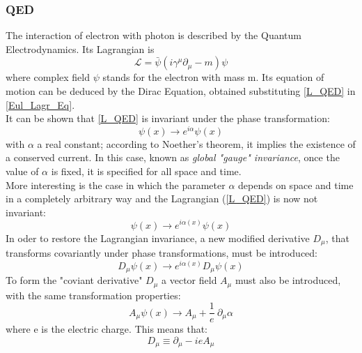 \subsubsection{QED}
The interaction of electron with photon is described by the Quantum Electrodynamics. Its Lagrangian is
\begin{equation}
\mathcal{L} = \bar{\psi}(i\gamma^{\mu}\partial_{\mu}-m)\psi
\label{L_QED}
\end{equation}
where complex field $\psi$ stands for the electron with mass m. Its equation of motion can be deduced by the Dirac Equation, obtained substituting \ref{L_QED} in \ref{Eul_Lagr_Eq}.\\
It can be shown that \ref{L_QED} is invariant under the phase transformation:
\begin{equation}
\psi(x)\to e^{i\alpha} \psi(x)
\label{global_trans}
\end{equation}
with $\alpha$ a real constant; according to Noether's theorem, it implies the existence of a conserved current.
In this case, known as \textit{global "gauge" invariance}, once the value of $\alpha$ is fixed, it is specified for all space and time. \\
More interesting is the case in which the parameter $\alpha$ depends on space and time in a completely arbitrary way and the Lagrangian (\ref{L_QED}) is now not invariant:
\begin{equation}
\psi(x)\to e^{i\alpha(x)} \psi(x)
\label{local_trans}
\end{equation}
In oder to restore the Lagrangian invariance, a new modified derivative $D_{\mu}$, that transforms covariantly under phase transformations, must be introduced: 
\begin{equation}
D_{\mu}\psi(x)\to e^{i\alpha(x)} D_{\mu}\psi(x)
\label{D_trans}
\end{equation}
To form the "coviant derivative" $D_{\mu}$ a vector field $A_{\mu}$ must also be introduced, with the same transformation properties: 
\begin{equation}
A_{\mu}\psi(x)\to A_{\mu} + \frac{1}{e}\ \partial_{\mu} \alpha
\label{A_trans}
\end{equation}
where e is the electric charge. This means that:
\begin{equation}
D_{\mu} \equiv \partial_{\mu} - ieA_{\mu}
\label{D_defin}
\end{equation}



